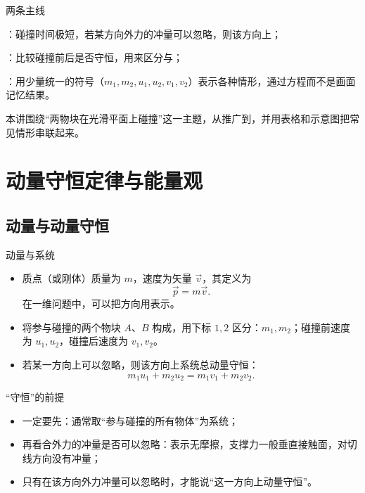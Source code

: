 \documentclass[a4paper,11pt]{ctexart}
\begin{document}
\begin{conceptbox}{两条主线}
\begin{focuspoints}
  \item {}：碰撞时间极短，若某方向外力的冲量可以忽略，则该方向上；
  \item {}：比较碰撞前后是否守恒，用来区分与；
  \item {}：用少量统一的符号（$m_1,m_2,u_1,u_2,v_1,v_2$）表示各种情形，通过方程而不是画面记忆结果。
\end{focuspoints}
\end{conceptbox}

本讲围绕“两物块在光滑平面上碰撞”这一主题，从推广到，并用表格和示意图把常见情形串联起来。

\section{动量守恒定律与能量观}

\subsection{动量与动量守恒}

\begin{definitionbox}{动量与系统}
\begin{itemize}
  \item 质点（或刚体）质量为 $m$，速度为矢量 $\vec v$，其定义为
  \[
    \vec p = m\vec v.
  \]
  在一维问题中，可以把方向用表示。
  \item 将参与碰撞的两个物块 $A$、$B$ 构成，用下标 $1,2$ 区分：$m_1,m_2$；碰撞前速度为 $u_1,u_2$，碰撞后速度为 $v_1,v_2$。
  \item 若某一方向上可以忽略，则该方向上系统总动量守恒：
  \[
    m_1u_1 + m_2u_2 = m_1v_1 + m_2v_2.
  \]
\end{itemize}
\end{definitionbox}

\begin{warningbox}{“守恒”的前提}
\begin{itemize}
  \item 一定要先：通常取“参与碰撞的所有物体”为系统；
  \item 再看合外力的冲量是否可以忽略：表示无摩擦，支撑力一般垂直接触面，对切线方向没有冲量；
  \item 只有在该方向外力冲量可以忽略时，才能说“这一方向上动量守恒”。
\end{itemize}
\end{warningbox}
\end{document}
